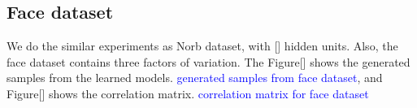 \subsection{Face dataset}
We do the similar experiments as Norb dataset, with [] hidden units. Also, the face dataset contains three factors of variation. The Figure[] shows the generated samples from the learned models. \textcolor{blue}{generated samples from face dataset}, and Figure[] shows the correlation matrix. \textcolor{blue}{correlation matrix for face dataset}


